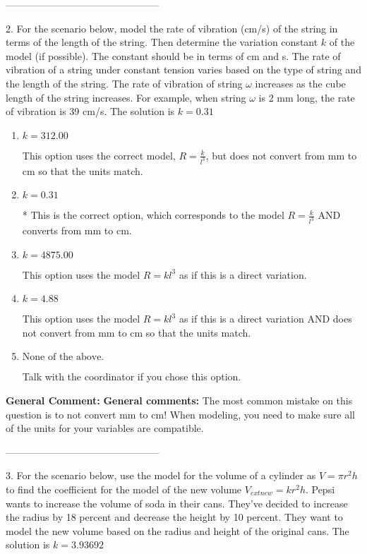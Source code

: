 \documentclass{extbook}[14pt]
\begin{document}
-----------------------------------------------

2. For the scenario below, model the rate of vibration (cm/s) of the string in terms of the length of the string. Then determine the variation constant $k$ of the model (if possible). The constant should be in terms of cm and s.
The rate of vibration of a string under constant tension varies based on the type of string and the length of the string. The rate of vibration of string $\omega$ increases as the cube length of the string increases. For example, when string $\omega$ is 2 mm long, the rate of vibration is 39 cm/s. 
The solution is $ k = 0.31 $ 

\begin{enumerate}[label=\Alph*.] 
\item $ k = 312.00 $ 

 This option uses the correct model, $R = \frac{k}{l^{3}}$, but does not convert from mm to cm so that the units match. 
\item $ k = 0.31 $ 

 * This is the correct option, which corresponds to the model $R = \frac{k}{l^{3}}$ AND converts from mm to cm. 
\item $ k = 4875.00 $ 

 This option uses the model $R = kl^{3}$ as if this is a direct variation. 
\item $ k = 4.88 $ 

 This option uses the model $R = kl^{3}$ as if this is a direct variation AND does not convert from mm to cm so that the units match. 
\item $ \text{None of the above.} $ 

 Talk with the coordinator if you chose this option. 
\end{enumerate} 
 
\textbf{General Comment:} \textbf{General comments:} The most common mistake on this question is to not convert mm to cm! When modeling, you need to make sure all of the units for your variables are compatible. 

-----------------------------------------------

3. For the scenario below, use the model for the volume of a cylinder as $V = \pi r^2 h$ to find the coefficient for the model of the new volume $V_{	ext{new}} = k r^2 h$.
Pepsi wants to increase the volume of soda in their cans. They've decided to increase the radius by 18 percent and decrease the height by 10 percent. They want to model the new volume based on the radius and height of the original cans. 
The solution is $ k = 3.93692 $ 
\end{document}
